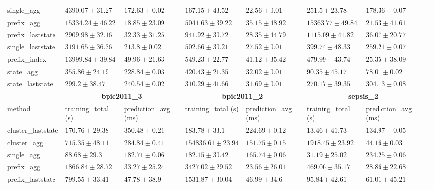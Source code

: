 \documentclass[twoside,11pt]{Latex/Classes/PhDthesisPSnPDF}
\begin{document}
\begin{table}[h]
{\begin{tabular}{llllllll}
			single\_agg & $4390.07 \pm 31.27$ & $172.63 \pm 0.02$ & $167.15 \pm 43.52$ & $22.56 \pm 0.01$ & $251.5 \pm 23.78$ & $178.36 \pm 0.07$ \\ 
			prefix\_agg & $15334.24 \pm 46.22$ & $\mathbf{18.85 \pm 23.09}$ & $5041.63 \pm 39.22$ & $35.15 \pm 48.92$ & $15363.77 \pm 49.84$ & $\mathbf{21.53 \pm 41.61}$ \\ 
			prefix\_laststate & $2909.98 \pm 32.16$ & $32.33 \pm 31.25$ & $941.92 \pm 30.72$ & $28.35 \pm 44.79$ & $1115.09 \pm 41.82$ & $36.07 \pm 20.77$ \\ 
			single\_laststate & $3191.65 \pm 36.36$ & $213.8 \pm 0.02$ & $502.66 \pm 30.21$ & $27.52 \pm 0.01$ & $399.74 \pm 48.33$ & $259.21 \pm 0.07$ \\ 
			prefix\_index & $13999.84 \pm 39.84$ & $49.96 \pm 21.63$ & $549.23 \pm 22.77$ & $41.12 \pm 35.42$ & $479.99 \pm 43.74$ & $25.35 \pm 38.09$ \\ 
			state\_agg & $355.86 \pm 24.19$ & $228.84 \pm 0.03$ & $420.43 \pm 21.35$ & $32.02 \pm 0.01$ & $\mathbf{90.35 \pm 45.17}$ & $78.01 \pm 0.02$ \\ 
			state\_laststate & $\mathbf{299.2 \pm 38.47}$ & $240.54 \pm 0.02$ & $\mathbf{310.29 \pm 41.66}$ & $31.69 \pm 0.01$ & $270.17 \pm 39.35$ & $304.13 \pm 0.08$ \\ 
			\bottomrule
			\toprule
			& \multicolumn{2}{c}{{\bfseries bpic2011\_3}} & \multicolumn{2}{c}{{\bfseries bpic2011\_2}} & \multicolumn{2}{c}{{\bfseries sepsis\_2}} \\ \cmidrule(lr){2-3} \cmidrule(lr){4-5} \cmidrule(lr){6-7}
			method  & training\_total (s) & prediction\_avg (ms) & training\_total (s) & prediction\_avg (ms) & training\_total (s) & prediction\_avg (ms) \\ \midrule
			cluster\_laststate & $170.76 \pm 29.38$ & $350.48 \pm 0.21$ & $183.78 \pm 33.1$ & $224.69 \pm 0.12$ & $13.46 \pm 41.73$ & $134.97 \pm 0.05$ \\ 
			cluster\_agg & $715.35 \pm 48.11$ & $284.84 \pm 0.41$ & $154836.61 \pm 23.94$ & $151.75 \pm 0.15$ & $1918.45 \pm 23.92$ & $44.16 \pm 0.03$ \\ 
			single\_agg & $88.68 \pm 29.3$ & $182.71 \pm 0.06$ & $182.15 \pm 30.42$ & $165.74 \pm 0.06$ & $31.19 \pm 25.02$ & $234.25 \pm 0.06$ \\ 
			prefix\_agg & $1866.84 \pm 28.72$ & $33.27 \pm 25.24$ & $3427.02 \pm 29.52$ & $\mathbf{23.56 \pm 26.01}$ & $469.06 \pm 35.17$ & $28.86 \pm 22.68$ \\ 
			prefix\_laststate & $799.55 \pm 33.41$ & $47.78 \pm 38.9$ & $1531.87 \pm 30.04$ & $46.99 \pm 34.6$ & $95.84 \pm 42.61$ & $61.01 \pm 45.21$ \\ 

\end{tabular}}
\end{table}
\end{document}
